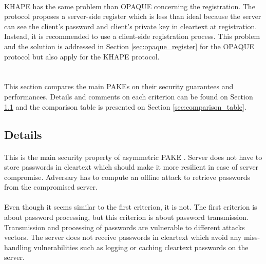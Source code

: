 ﻿\documentclass[../report.tex]{subfiles}
\begin{document}
\paragraph{}
KHAPE has the same problem than OPAQUE concerning the registration.
The protocol proposes a server-side register which is less than ideal because the server can see the client's password and client's private key in cleartext at registration.
Instead, it is recommended to use a client-side registration process.
This problem and the solution is addressed in Section \ref{sec:opaque_register} for the OPAQUE protocol but also apply for the KHAPE protocol.




\section{}
This section compares the main PAKEs on their security guarantees and performances. Details and comments on each criterion can be found on Section \ref{sec:comparison_details} and the comparison table is presented on Section \ref{sec:comparison_table}.

 
\subsection{Details} \label{sec:comparison_details}


\paragraph{}
This is the main security property of asymmetric PAKE \cite{aPAKE_Formalized}. Server does not have to store passwords in cleartext which should make it more resilient in case of server compromise. Adversary has to compute an offline attack to retrieve passwords from the compromised server.


\paragraph{}
Even though it seems similar to the first criterion, it is not. The first criterion is about password processing, but this criterion is about password transmission. Transmission and processing of passwords are vulnerable to different attacks vectors.
The server does not receive passwords in cleartext which avoid any miss-handling vulnerabilities such as logging or caching cleartext passwords on the server.
\end{document}
